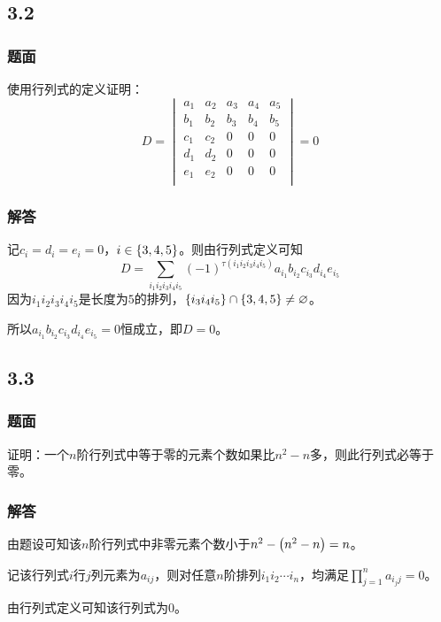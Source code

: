 \documentclass[10pt,xcolor=svgnames]{beamer} %
\begin{document}
\subsection*{3.2}
\begin{frame}
    \frametitle{题面}
    使用行列式的定义证明：
    \begin{equation*}
        D=
        \begin{vmatrix}
            a_1 & a_2 & a_3 & a_4 & a_5 \\
            b_1 & b_2 & b_3 & b_4 & b_5 \\
            c_1 & c_2 & 0   & 0   & 0   \\
            d_1 & d_2 & 0   & 0   & 0   \\
            e_1 & e_2 & 0   & 0   & 0   \\
        \end{vmatrix}=0
    \end{equation*}
\end{frame}
\begin{frame}
    \frametitle{解答}
    记\(c_i=d_i=e_i=0\)，\(i\in\left\{3,4,5 \right\}\)。则由行列式定义可知
    \begin{equation*}
        D=\sum_{i_1i_2i_3i_4i_5}(-1)^{\tau(i_1i_2i_3i_4i_5)}a_{i_1}b_{i_2}c_{i_3}d_{i_4}e_{i_5}
    \end{equation*}
    因为\(i_1i_2i_3i_4i_5\)是长度为\(5\)的排列，\(\left\{i_3i_4i_5 \right\}\cap\left\{3,4,5 \right\}\neq\varnothing\)。

    所以\(a_{i_1}b_{i_2}c_{i_3}d_{i_4}e_{i_5}=0\)恒成立，即\(D=0\)。
\end{frame}

\subsection*{3.3}
\begin{frame}
    \frametitle{题面}
    证明：一个\(n\)阶行列式中等于零的元素个数如果比\(n^2-n\)多，则此行列式必等于零。
\end{frame}
\begin{frame}
    \frametitle{解答}
    由题设可知该\(n\)阶行列式中非零元素个数小于\(n^2-\left( n^2-n \right)=n\)。

    记该行列式\(i\)行\(j\)列元素为\(a_{ij}\)，则对任意\(n\)阶排列\(i_1i_2\cdots i_n\)，均满足\(\prod_{j=1}^{n}a_{i_jj}=0\)。

    由行列式定义可知该行列式为\(0\)。
\end{frame}
\end{document}
